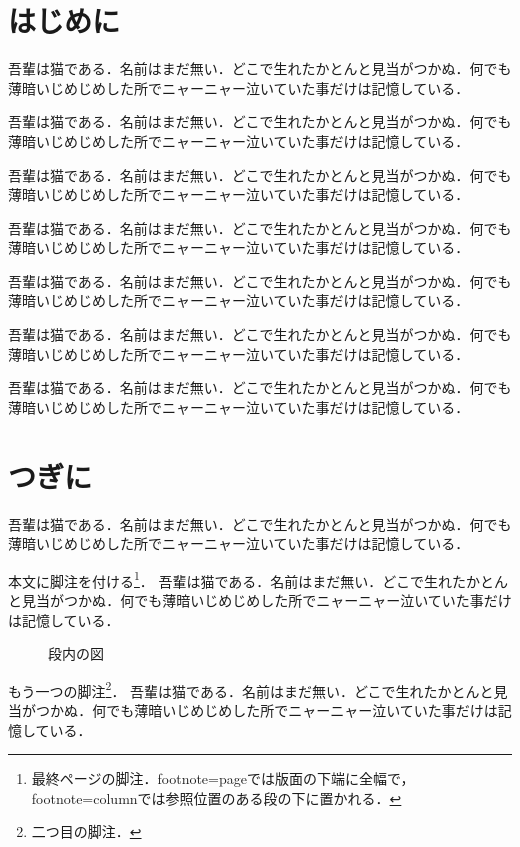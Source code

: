 \documentclass[twocolumn,paper=a6,fontsize=8pt]{jlreq}
\newcommand\para{吾輩は猫である．名前はまだ無い．どこで生れたかとんと見当がつかぬ．何でも薄暗いじめじめした所でニャーニャー泣いていた事だけは記憶している．\par}
\begin{document}
\section{はじめに}
\para\para\para\para\para\para\para
\section{つぎに}
\para
本文に脚注を付ける\footnote{最終ページの脚注．footnote=pageでは版面の下端に全幅で，footnote=columnでは参照位置のある段の下に置かれる．}．
\para
\begin{figure}[t]
  \centering
  \caption{段内の図}
\end{figure}
もう一つの脚注\footnote{二つ目の脚注．}．
\para
\end{document}
